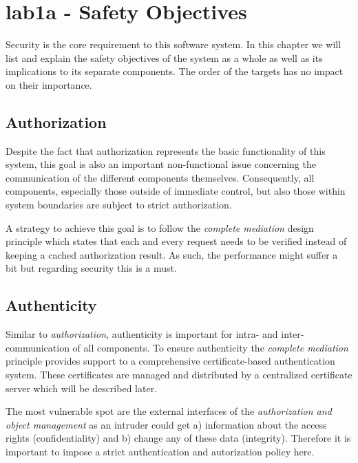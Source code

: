 \documentclass[12pt,a4paper,titlepage,oneside]{scrartcl}
\begin{document}
\maketitle
\setcounter{section}{0}
\setcounter{tocdepth}{2}
\tableofcontents

%
%

\section{lab1a - Safety Objectives}
Security is the core requirement to this software system. In this chapter we will list and explain the
safety objectives of the system as a whole as well as its implications to its separate components. The order
of the targets has no impact on their importance.


\subsection{Authorization}
Despite the fact that authorization represents the basic functionality of this system, this goal is also
an important non-functional issue concerning the communication of the different components themselves. Consequently, all components,
especially those outside of immediate control, but also those within system boundaries are subject to strict
authorization.

A strategy to achieve this goal is to follow the \emph{complete mediation} design principle which states that each and
every request needs to be verified instead of keeping a cached authorization result. As such, the performance might suffer
a bit but regarding security this is a must.


\subsection{Authenticity}
Similar to \emph{authorization}, authenticity is important for intra- and inter-communication of all components. To
ensure authenticity the \emph{complete mediation} principle provides support to a comprehensive certificate-based authentication
system. These certificates are managed and distributed by a centralized certificate server which will be described later.

The most vulnerable spot are the external interfaces of the \emph{authorization and object management} as an intruder could get
a) information about the access rights (confidentiality) and b) change any of these data (integrity). Therefore it is important to impose
a strict authentication and autorization policy here.
\end{document}

